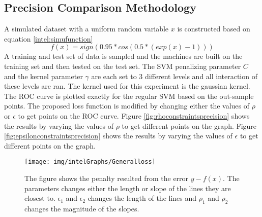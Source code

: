 	\subsection{Precision Comparison Methodology}\label{sec:precisecompare}
	A simulated dataset with a uniform random variable $x$ is constructed based on equation \ref{intel:simufunction}
	\begin{equation}\label{intel:simufunction}
	f(x)=sign( 0.95*cos(0.5*(exp(x)-1)))
	\end{equation}
	A training and test set of data is sampled and the machines are built on the training set and then tested on the test set. The SVM penalizing parameter $C$ and the kernel parameter $\gamma$ are each set to 3 different levels and all interaction of these levels are ran. The kernel used for this experiment is the gaussian kernel. The ROC curve is plotted exactly for the regular SVM based on the out-sample points. The proposed loss function is modified by changing either the values of $\rho$ or $\epsilon$ to get points on the ROC curve. Figure \ref{fig:rhoconstraintsprecision} shows the results by varying the values of $\rho$ to get different points on the graph. Figure \ref{fig:epsilonconstraintsprecision} shows the results by varying the values of $\epsilon$ to get different points on the graph. 
	\begin{figure}
	 \centering
	\texttt{[image: img/intelGraphs/Generalloss]}\\
	 \caption{The figure shows the penalty resulted from the error $y-f(x)$. The parameters changes either the length or slope of the lines they are closest to. $\epsilon_1$ and $\epsilon_2$ changes the length of the lines and $\rho_1$ and $\rho_2$ changes the magnitude of the slopes.}
	 \label{Fig:General Loss Intel}
	\end{figure} 


